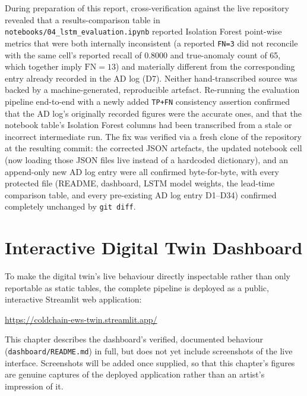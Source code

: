 \documentclass[11pt,a4paper,oneside]{report}
\begin{document}
\begin{methodologydecision}
During preparation of this report, cross-verification against the live repository revealed that a results-comparison table in \texttt{notebooks/04\_lstm\_evaluation.ipynb} reported Isolation Forest point-wise metrics that were both internally inconsistent (a reported \texttt{FN=3} did not reconcile with the same cell's reported recall of 0.8000 and true-anomaly count of 65, which together imply $\text{FN}=13$) and materially different from the corresponding entry already recorded in the AD log (D7). Neither hand-transcribed source was backed by a machine-generated, reproducible artefact. Re-running the evaluation pipeline end-to-end with a newly added \texttt{TP+FN} consistency assertion confirmed that the AD log's originally recorded figures were the accurate ones, and that the notebook table's Isolation Forest columns had been transcribed from a stale or incorrect intermediate run. The fix was verified via a fresh clone of the repository at the resulting commit: the corrected JSON artefacts, the updated notebook cell (now loading those JSON files live instead of a hardcoded dictionary), and an append-only new AD log entry were all confirmed byte-for-byte, with every protected file (README, dashboard, LSTM model weights, the lead-time comparison table, and every pre-existing AD log entry D1--D34) confirmed completely unchanged by \texttt{git diff}.
\end{methodologydecision}

\chapter[Digital Twin Dashboard]{Interactive Digital Twin Dashboard}
\label{chap:dashboard}

To make the digital twin's live behaviour directly inspectable rather than only reportable as static tables, the complete pipeline is deployed as a public, interactive Streamlit web application:

\begin{center}
\url{https://coldchain-ews-twin.streamlit.app/}
\end{center}

\begin{limitationbox}
\raggedright
This chapter describes the dashboard's verified, documented behaviour (\texttt{dashboard/README.md}) in full, but does not yet include screenshots of the live interface. Screenshots will be added once supplied, so that this chapter's figures are genuine captures of the deployed application rather than an artist's impression of it.
\end{limitationbox}
\end{document}
